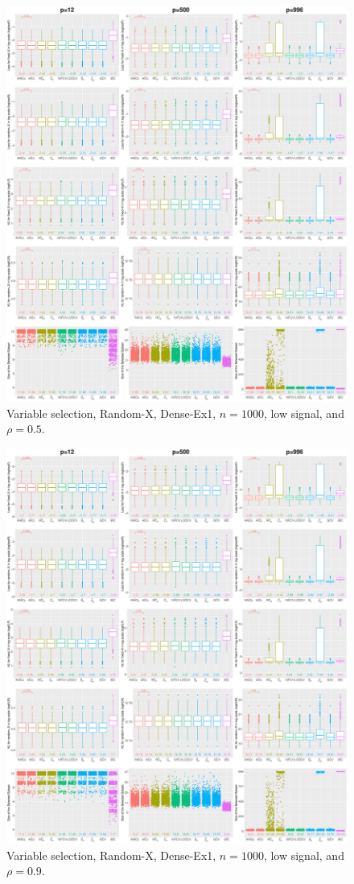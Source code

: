 \begin{figure}[!ht]
\centering
\includegraphics[width=\textwidth]{figures/supplement/randomx/subset_selection/Dense-Ex1_n1000_lsnr_rho05.eps}
\caption{Variable selection, Random-X, Dense-Ex1, $n=1000$, low signal, and $\rho=0.5$.}
\end{figure}
\clearpage
\begin{figure}[!ht]
\centering
\includegraphics[width=\textwidth]{figures/supplement/randomx/subset_selection/Dense-Ex1_n1000_lsnr_rho09.eps}
\caption{Variable selection, Random-X, Dense-Ex1, $n=1000$, low signal, and $\rho=0.9$.}
\end{figure}
\clearpage

